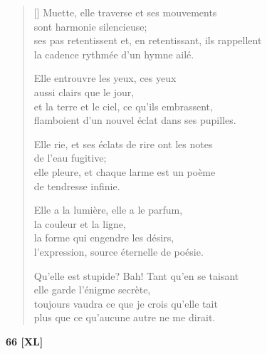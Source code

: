 \documentclass[a4paper,12pt]{book}
\begin{document}
\begin{verse}[\versewidth]
  Muette, elle traverse et ses mouvements \\
  sont harmonie silencieuse; \\
  ses pas retentissent et, en retentissant, ils rappellent \\
  la cadence rythmée d'un hymne ailé.

  Elle entrouvre les yeux, ces yeux \\
  aussi clairs que le jour, \\
  et la terre et le ciel, ce qu'ils embrassent, \\
  flamboient d'un nouvel éclat dans ses pupilles.

  Elle rie, et ses éclats de rire ont les notes \\
  de l'eau fugitive; \\
  elle pleure, et chaque larme est un poème \\
  de tendresse infinie.

  Elle a la lumière, elle a le parfum, \\
  la couleur et la ligne, \\
  la forme qui engendre les désirs, \\
  l'expression, source éternelle de poésie.

  Qu'elle est stupide? Bah! Tant qu'en se taisant \\
  elle garde l'énigme secrète, \\
  toujours vaudra ce que je crois qu'elle tait \\
  plus que ce qu'aucune autre ne me dirait.
\end{verse}

\bigskip

\begin{center}
  \textbf{66 [XL]}
\end{center}

\settowidth{\versewidth}{Sa main dans mes mains,}
\end{document}

